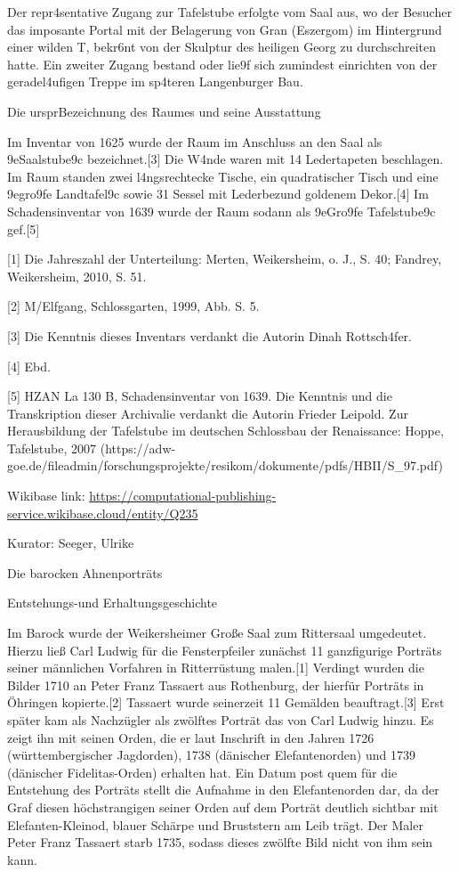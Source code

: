 \documentclass[
  letterpaper,
]{book}
\begin{document}
Der repr\xa4sentative Zugang zur Tafelstube erfolgte vom Saal aus,
wo der Besucher das imposante Portal mit der Belagerung von Gran
(Eszergom) im Hintergrund einer wilden T\xbcrkenschlacht,
bekr\xb6nt von der Skulptur des heiligen Georg zu durchschreiten
hatte. Ein zweiter Zugang bestand oder lie\x9f sich zumindest
einrichten von der geradel\xa4ufigen Treppe im sp\xa4teren
Langenburger Bau.

Die urspr\xbcngliche Bezeichnung des Raumes und seine Ausstattung

Im Inventar von 1625 wurde der Raum im Anschluss an den
Saal als \x9eSaalstube\x9c bezeichnet.{[}3{]} Die
W\xa4nde waren mit 14 Ledertapeten beschlagen. Im Raum standen zwei
l\xa4ngsrechtecke Tische, ein quadratischer Tisch und eine
\x9egro\x9fe Landtafel\x9c sowie 31 Sessel mit
Lederbez\xbcgen und goldenem Dekor.{[}4{]} Im Schadensinventar von
1639 wurde der Raum sodann als \x9eGro\x9fe
Tafelstube\x9c gef\xbchrt.{[}5{]}

{[}1{]} Die Jahreszahl der Unterteilung: Merten, Weikersheim, o. J., S.
40; Fandrey, Weikersheim, 2010, S. 51.

{[}2{]} M\xbcnzenmayer/Elfgang, Schlossgarten, 1999, Abb. S. 5.

{[}3{]} Die Kenntnis dieses Inventars verdankt die Autorin Dinah
Rottsch\xa4fer.

{[}4{]} Ebd.

{[}5{]} HZAN La 130 B, Schadensinventar von 1639. Die
Kenntnis und die Transkription dieser Archivalie verdankt die Autorin
Frieder Leipold. Zur Herausbildung der Tafelstube im deutschen
Schlossbau der Renaissance: Hoppe, Tafelstube, 2007
(https://adw-goe.de/fileadmin/forschungsprojekte/resikom/dokumente/pdfs/HBII/S\_97.pdf)

Wikibase link:
\url{https://computational-publishing-service.wikibase.cloud/entity/Q235}

Kurator: Seeger, Ulrike

Die barocken Ahnenporträts

Entstehungs-und Erhaltungsgeschichte

Im Barock wurde der Weikersheimer Große Saal zum Rittersaal umgedeutet.
Hierzu ließ Carl Ludwig für die Fensterpfeiler zunächst 11 ganzfigurige
Porträts seiner männlichen Vorfahren in Ritterrüstung malen.{[}1{]}
Verdingt wurden die Bilder 1710 an Peter Franz Tassaert aus Rothenburg,
der hierfür Porträts in Öhringen kopierte.{[}2{]} Tassaert wurde
seinerzeit 11 Gemälden beauftragt.{[}3{]} Erst später kam als Nachzügler
als zwölftes Porträt das von Carl Ludwig hinzu. Es zeigt ihn mit seinen
Orden, die er laut Inschrift in den Jahren 1726 (württembergischer
Jagdorden), 1738 (dänischer Elefantenorden) und 1739 (dänischer
Fidelitas-Orden) erhalten hat. Ein Datum post quem für die Entstehung
des Porträts stellt die Aufnahme in den Elefantenorden dar, da der Graf
diesen höchstrangigen seiner Orden auf dem Porträt deutlich sichtbar mit
Elefanten-Kleinod, blauer Schärpe und Bruststern am Leib trägt. Der
Maler Peter Franz Tassaert starb 1735, sodass dieses zwölfte Bild nicht
von ihm sein kann.
\end{document}
